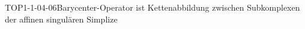 
\begin{PROP}{TOP1-1-04-06}{Barycenter-Operator ist Kettenabbildung zwischen Subkomplexen der affinen singulären Simplize}
\end{PROP}
